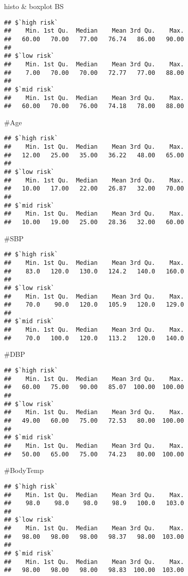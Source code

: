 \documentclass[
  ignorenonframetext,
]{beamer}
\begin{document}
\begin{frame}[fragile]{histo \& boxplot BS}
\begin{verbatim}
## $`high risk`
##    Min. 1st Qu.  Median    Mean 3rd Qu.    Max. 
##   60.00   70.00   77.00   76.74   86.00   90.00 
## 
## $`low risk`
##    Min. 1st Qu.  Median    Mean 3rd Qu.    Max. 
##    7.00   70.00   70.00   72.77   77.00   88.00 
## 
## $`mid risk`
##    Min. 1st Qu.  Median    Mean 3rd Qu.    Max. 
##   60.00   70.00   76.00   74.18   78.00   88.00
\end{verbatim}

\#Age

\begin{verbatim}
## $`high risk`
##    Min. 1st Qu.  Median    Mean 3rd Qu.    Max. 
##   12.00   25.00   35.00   36.22   48.00   65.00 
## 
## $`low risk`
##    Min. 1st Qu.  Median    Mean 3rd Qu.    Max. 
##   10.00   17.00   22.00   26.87   32.00   70.00 
## 
## $`mid risk`
##    Min. 1st Qu.  Median    Mean 3rd Qu.    Max. 
##   10.00   19.00   25.00   28.36   32.00   60.00
\end{verbatim}

\#SBP

\begin{verbatim}
## $`high risk`
##    Min. 1st Qu.  Median    Mean 3rd Qu.    Max. 
##    83.0   120.0   130.0   124.2   140.0   160.0 
## 
## $`low risk`
##    Min. 1st Qu.  Median    Mean 3rd Qu.    Max. 
##    70.0    90.0   120.0   105.9   120.0   129.0 
## 
## $`mid risk`
##    Min. 1st Qu.  Median    Mean 3rd Qu.    Max. 
##    70.0   100.0   120.0   113.2   120.0   140.0
\end{verbatim}

\#DBP

\begin{verbatim}
## $`high risk`
##    Min. 1st Qu.  Median    Mean 3rd Qu.    Max. 
##   60.00   75.00   90.00   85.07  100.00  100.00 
## 
## $`low risk`
##    Min. 1st Qu.  Median    Mean 3rd Qu.    Max. 
##   49.00   60.00   75.00   72.53   80.00  100.00 
## 
## $`mid risk`
##    Min. 1st Qu.  Median    Mean 3rd Qu.    Max. 
##   50.00   65.00   75.00   74.23   80.00  100.00
\end{verbatim}

\#BodyTemp

\begin{verbatim}
## $`high risk`
##    Min. 1st Qu.  Median    Mean 3rd Qu.    Max. 
##    98.0    98.0    98.0    98.9   100.0   103.0 
## 
## $`low risk`
##    Min. 1st Qu.  Median    Mean 3rd Qu.    Max. 
##   98.00   98.00   98.00   98.37   98.00  103.00 
## 
## $`mid risk`
##    Min. 1st Qu.  Median    Mean 3rd Qu.    Max. 
##   98.00   98.00   98.00   98.83  100.00  103.00
\end{verbatim}


\end{frame}
\end{document}
